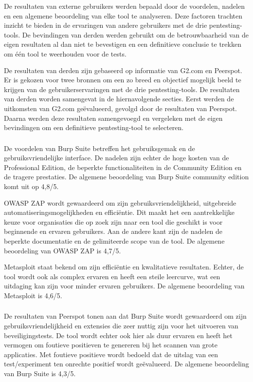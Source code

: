 De resultaten van externe gebruikers werden bepaald door de voordelen, nadelen en een algemene 
beoordeling van elke tool te analyseren. Deze factoren trachten inzicht te bieden in de ervaringen van andere gebruikers met de drie pentesting-tools. 
De bevindingen van derden werden gebruikt om de betrouwbaarheid van de eigen resultaten al dan niet te bevestigen en een definitieve conclusie 
te trekken om één tool te weerhouden voor de tests.

De resultaten van derden zijn gebaseerd op informatie van G2.com en Peerspot. Er is gekozen voor twee bronnen om een zo 
breed en objectief mogelijk beeld te krijgen van de gebruikerservaringen met de drie pentesting-tools. De resultaten van derden worden 
samengevat in de hiernavolgende secties. Eerst werden de uitkomsten van G2.com geëvalueerd, gevolgd door de resultaten van Peerspot. 
Daarna werden deze resultaten samengevoegd en vergeleken met de eigen bevindingen om een definitieve pentesting-tool te 
selecteren.

\subsubsection{}
De voordelen van Burp Suite betreffen het gebruiksgemak en de gebruiksvriendelijke interface. De nadelen zijn echter 
de hoge kosten van de Professional Edition, de beperkte functionaliteiten in de Community Edition en de tragere prestaties. De 
algemene beoordeling van Burp Suite community edition komt uit op 4,8/5.

OWASP ZAP wordt gewaardeerd om zijn gebruiksvriendelijkheid, uitgebreide automatiseringsmogelijkheden en efficiëntie. 
Dit maakt het een aantrekkelijke keuze voor organisaties die op zoek zijn naar een tool die geschikt is voor beginnende en 
ervaren gebruikers. Aan de andere kant zijn de nadelen de beperkte documentatie en de gelimiteerde scope van de tool. De 
algemene beoordeling van OWASP ZAP is 4,7/5.

Metasploit staat bekend om zijn efficiëntie en kwalitatieve resultaten. Echter, de tool wordt ook als complex ervaren en 
heeft een steile leercurve, wat een uitdaging kan zijn voor minder ervaren gebruikers. De algemene beoordeling van Metasploit 
is 4,6/5.

\subsubsection{}
De resultaten van Peerspot tonen aan dat Burp Suite wordt gewaardeerd om zijn gebruiksvriendelijkheid en extensies die zeer 
nuttig zijn voor het uitvoeren van beveiligingstests. De tool wordt echter ook hier als duur ervaren en heeft het vermogen om foutieve 
positieven te genereren bij het scannen van grote applicaties. Met foutieve positieve wordt bedoeld dat de uitslag van een 
test/experiment ten onrechte positief wordt geëvalueerd. De algemene beoordeling van Burp Suite is 4,3/5.

